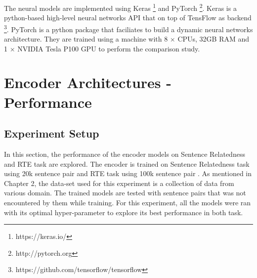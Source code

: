 \documentclass[12pt]{report} %
\begin{document}
   The neural models are implemented using Keras \footnote{https://keras.io/} and PyTorch  \footnote{http://pytorch.org}. Keras is a python-based high-level neural networks API that on top of TensFlow as backend \footnote{https://github.com/tensorflow/tensorflow}. PyTorch is a python package that faciliates to build a dynamic neural networks architecture. They are trained using a machine with 8 $\times$ CPUs, 32GB RAM and 1 $\times$ NVIDIA Tesla P100 GPU to perform the comparison study.
 
 
 


\section{Encoder Architectures - Performance}

\subsection{Experiment Setup}

\label{performance}
In this section, the performance of the encoder models on Sentence Relatedness and RTE task are explored. The encoder is trained on Sentence Relatedness task using 20k sentence pair \cite{cer2017semeval} and RTE task using 100k sentence pair \cite{bowman2015large}. As mentioned in Chapter 2, the data-set used for this experiment is a collection of data from various domain. The trained models are tested with sentence pairs that was not encountered by them while training. For this experiment, all the models were ran with its optimal hyper-parameter to explore  its best performance in both task. 
\end{document}
